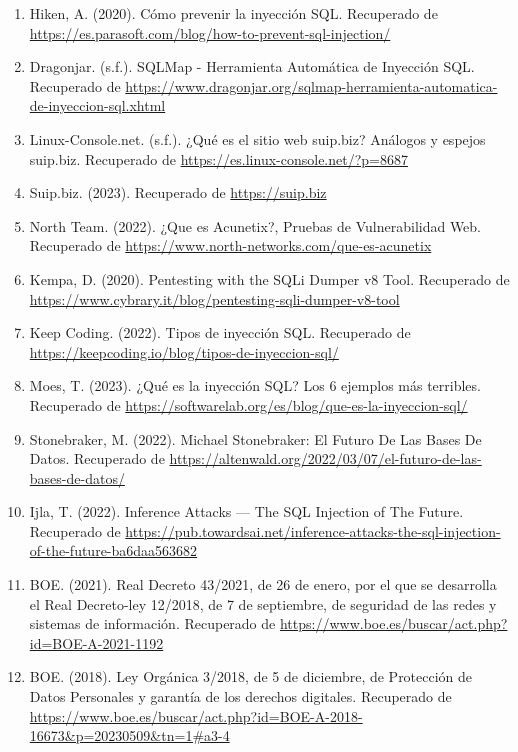 \documentclass[11pt]{report}
\begin{document}
\begin{enumerate}
\item Hiken, A. (2020). Cómo prevenir la inyección SQL. Recuperado de \url{https://es.parasoft.com/blog/how-to-prevent-sql-injection/}

\item Dragonjar. (s.f.). SQLMap - Herramienta Automática de Inyección SQL. Recuperado de \url{https://www.dragonjar.org/sqlmap-herramienta-automatica-de-inyeccion-sql.xhtml}

\item Linux-Console.net. (s.f.). ¿Qué es el sitio web suip.biz? Análogos y espejos suip.biz. Recuperado de \url{https://es.linux-console.net/?p=8687}

\item Suip.biz. (2023). Recuperado de \url{https://suip.biz}

\item North Team. (2022). ¿Que es Acunetix?, Pruebas de Vulnerabilidad Web. Recuperado de \url{https://www.north-networks.com/que-es-acunetix}

\item Kempa, D. (2020). Pentesting with the SQLi Dumper v8 Tool. Recuperado de \url{https://www.cybrary.it/blog/pentesting-sqli-dumper-v8-tool}

\item Keep Coding. (2022). Tipos de inyección SQL. Recuperado de \url{https://keepcoding.io/blog/tipos-de-inyeccion-sql/}

\item Moes, T. (2023). ¿Qué es la inyección SQL? Los 6 ejemplos más terribles. Recuperado de \url{https://softwarelab.org/es/blog/que-es-la-inyeccion-sql/}

\item Stonebraker, M. (2022). Michael Stonebraker: El Futuro De Las Bases De Datos. Recuperado de \url{https://altenwald.org/2022/03/07/el-futuro-de-las-bases-de-datos/}

\item Ijla, T. (2022). Inference Attacks — The SQL Injection of The Future. Recuperado de \url{https://pub.towardsai.net/inference-attacks-the-sql-injection-of-the-future-ba6daa563682}

\item BOE. (2021). Real Decreto 43/2021, de 26 de enero, por el que se desarrolla el Real Decreto-ley 12/2018, de 7 de septiembre, de seguridad de las redes y sistemas de información. Recuperado de \url{https://www.boe.es/buscar/act.php?id=BOE-A-2021-1192}

\item BOE. (2018). Ley Orgánica 3/2018, de 5 de diciembre, de Protección de Datos Personales y garantía de los derechos digitales. Recuperado de \url{https://www.boe.es/buscar/act.php?id=BOE-A-2018-16673&p=20230509&tn=1#a3-4}


\end{enumerate}
\end{document}
